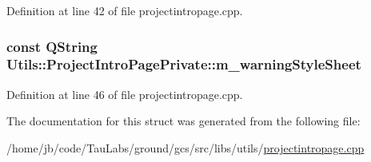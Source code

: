 \-Definition at line 42 of file projectintropage.\-cpp.

\hypertarget{struct_utils_1_1_project_intro_page_private_a6b536310e9c0d07f8eb1ac3f84f8d9b0}{
\subsubsection[{m\-\_\-warning\-Style\-Sheet}]{\setlength{\rightskip}{0pt plus 5cm}const {\bf \-Q\-String} {\bf \-Utils\-::\-Project\-Intro\-Page\-Private\-::m\-\_\-warning\-Style\-Sheet}}}\label{struct_utils_1_1_project_intro_page_private_a6b536310e9c0d07f8eb1ac3f84f8d9b0}


\-Definition at line 46 of file projectintropage.\-cpp.



\-The documentation for this struct was generated from the following file\-:\begin{DoxyCompactItemize}
\item 
/home/jb/code/\-Tau\-Labs/ground/gcs/src/libs/utils/\hyperlink{projectintropage_8cpp}{projectintropage.\-cpp}\end{DoxyCompactItemize}
